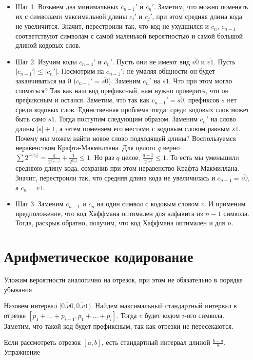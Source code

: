 \begin{itemize}
    \item Шаг 1. Возьмем два минимальных $ c_{n-1}'$ и $ c_n'$. Заметим, что можно поменять их с символами максимальной длины  $ c_i'$ и $ c_j'$, при этом средняя длина кода не увеличится. Значит, перестроили так, что код не ухудшился и $c_n$, $c_{n-1}$ соответствуют символам с самой маленькой вероятностью и самой большой длиной кодовых слов.
    
	\item Шаг 2. Изучим коды $ c_{n-1}'$ и $ c_n'$. Пусть они не имеют вид $ \overline{v 0}$ и $ \overline{v 1}$. Пусть $ \lvert c_{n-1}' \rvert  \le  \lvert c_n' \rvert $. Посмотрим на $ c_{n-1}'$: не умаляя общности он будет заканчиваться на $ 0$ ($c_{n-1}'= \overline{s 0}$). Заменим $ c_n'$ на $ s 1$. Что при этом могло сломаться? Так как наш код префиксный, нам нужно проверить, что он префиксным и остался. Заметим, что так как $c_{n-1}' = \overline{s 0}$, префиксов $s$ нет среди кодовых слов. Единственная проблема тогда: среди кодовых слов может быть само $\overline{s 1}$. Тогда поступим следующим образом. Заменим $c_n'$ на слово длины $|s|+1$, а затем поменяем его местами с кодовым словом равным $\overline{s1}$. Почему мы можем найти новое слово подходящей длины? Воспользуемся неравенством Крафта-Макмиллана. Для целого $q$ верно $\sum 2^{-|c_i|} = \frac{q}{2^{|c_{n-1}|}} + \frac{1}{2^{|c_n|}} \le 1$. Но раз $q$ целое, $\frac{q+1}{2^{|c_n|}} \le 1$. То есть мы уменьшили среднюю длину кода, сохранив при этом неравенство Крафта-Макмиллана. Значит, перестроили так, что средняя длина кода не увеличилась и $c_{n-1} = \overline{v0}$, а $c_n = \overline{v1}$.
	
	\item Шаг 3. Заменим $c_{n-1}$ и $c_n$ на один символ с кодовым словом $v$. И применим предположение, что код Хаффмана оптимален для алфавита из $n-1$ символа. Тогда, раскрыв обратно, получим, что код Хаффмана оптимален и для $n$.
\end{itemize}

\section{Арифметическое кодирование}
Уложим вероятности аналогично на отрезок, при этом не обязательно в порядке убывания.

Назовем  интервал $ \bigl[\overline{0. v 0}, \overline{0. v 1}\bigr)$. 
Найдем максимальный стандартный интервал в отрезке $[p_1 + \dots +p_{i-1}, p_1 + \dots + p_i]$.
Тогда $ v$ будет кодом  $i$-ого символа. 
Заметим, что такой код будет префиксным, так как отрезки не пересекаются.

\begin{proof*}
	Если рассмотреть отрезок $ [a, b]$, есть стандартный интервал длиной  $ \frac{b-a}{8}$. Упражнение
\end{proof*}

